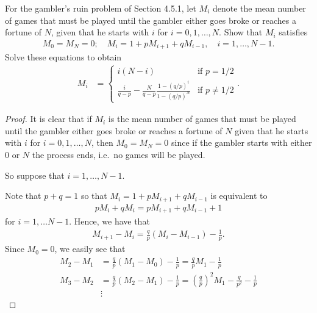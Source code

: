 \begin{problem}{4.59}
  For the gambler's ruin problem of Section 4.5.1, let $M_i$ denote the mean number
  of games that must be played until the gambler either goes broke or reaches a
  fortune of $N$, given that he starts with $i$ for $i=0,1,\dots, N$. Show that
  $M_i$ satisfies
  \begin{align*}
    M_0 = M_N = 0; \quad M_i = 1 + p M_{i+1} + q M_{i-1}, \quad i=1,\dots, N - 1.
  \end{align*}
  Solve these equations to obtain
  \begin{align*}
    M_i &=
    \begin{cases}
      i(N-i) & \text{if $p = 1/2$} \\
      \displaystyle \frac{i}{q-p} - \frac{N}{q-p}\frac{1-(q/p)^i}{1- (q/p)^N} & \text{if $p \neq 1/2$}
    \end{cases}.
  \end{align*}
\end{problem}

\begin{proof}
  It is clear that if $M_i$ is the mean number of games that must be played until
  the gambler either goes broke or reaches a fortune of $N$ given that he
  starts with $i$ for $i =0,1,\dots,N$,
  then $M_0 = M_N = 0$ since if the gambler starts with either $0$ or $N$ the process ends, i.e.\
  no games will be played.

  So suppose that $i = 1, \dots, N -1$.

  Note that $p + q = 1$ so that $M_i = 1 + p M_{i+1} + q M_{i-1}$ is equivalent to
  \begin{align*}
    p M_i + q M_i = pM_{i+ 1} + q M_{i-1} + 1
  \end{align*}
  for $i = 1, \dots N-1$. Hence, we have that
  \begin{align*}
    M_{i+1}- M_i  = \frac{q}{p}(M_i - M_{i-1}) - \frac{1}{p}.
  \end{align*}
  Since $M_0 = 0$, we easily see that
  \begin{align*}
    M_2 - M_1 &= \frac{q}{p}(M_1 - M_0) - \frac{1}{p} = \frac{q}{p}M_1 - \frac{1}{p}\\
    M_3 - M_2 &= \frac{q}{p}(M_2 - M_1) - \frac{1}{p} = \left(\frac{q}{p}\right)^2 M_1 - \frac{q}{p^2} - \frac{1}{p}\\
    &\vdots
  \end{align*}
\end{proof}
\newpage
